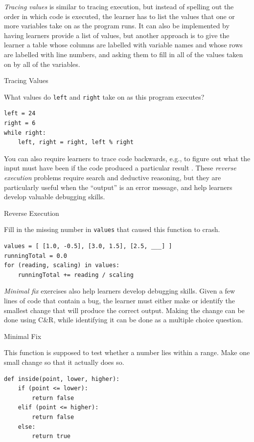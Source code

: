 \emph{Tracing values} is similar to tracing execution, but instead of
spelling out the order in which code is executed, the learner has to
list the values that one or more variables take on as the program
runs. It can also be implemented by having learners provide a list of
values, but another approach is to give the learner a table whose
columns are labelled with variable names and whose rows are labelled
with line numbers, and asking them to fill in all of the values taken
on by all of the variables.

\begin{callout}{Tracing Values}

  What values do \texttt{left} and \texttt{right} take on as this
  program executes?

\begin{verbatim}
left = 24
right = 6
while right:
    left, right = right, left % right
\end{verbatim}

\end{callout}

You can also require learners to trace code backwards, e.g., to figure
out what the input must have been if the code produced a particular
result \cite{Armo2008}.  These \emph{reverse execution} problems
require search and deductive reasoning, but they are particularly
useful when the ``output'' is an error message, and help learners
develop valuable debugging skills.

\begin{callout}{Reverse Execution}

  Fill in the missing number in \texttt{values} that caused this
  function to crash.

\begin{verbatim}
values = [ [1.0, -0.5], [3.0, 1.5], [2.5, ___] ]
runningTotal = 0.0
for (reading, scaling) in values:
    runningTotal += reading / scaling
\end{verbatim}
  
\end{callout}

\emph{Minimal fix} exercises also help learners develop debugging
skills.  Given a few lines of code that contain a bug, the learner
must either make or identify the smallest change that will produce the
correct output. Making the change can be done using C\&R, while
identifying it can be done as a multiple choice question.

\begin{callout}{Minimal Fix}

  This function is supposed to test whether a number lies within a
  range.  Make one small change so that it actually does so.

\begin{verbatim}
def inside(point, lower, higher):
    if (point <= lower):
        return false
    elif (point <= higher):
        return false
    else:
        return true
\end{verbatim}

\end{callout}

